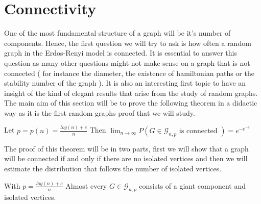 \section{Connectivity}

One of the most fundamental structure of a graph will be it's number of components. Hence, the first question we will try to ask is how often a random graph in the Erdos-Renyi model is connected. It is essential to answer this question as many other questions might not make sense on a graph that is not connected ( for instance the diameter, the existence of hamiltonian paths or the stability number of the graph ). 
\newline
It is also an interesting first topic to have an insight of the kind of elegant results that arise from the study of random graphs. The main aim of this section will be to prove the following theorem in a didactic way as it is the first random graphs proof that we will study.
\begin{theorem}
Let $p = p(n) = \frac{log(n) + c}{n}$
\newline
Then $\lim_{n \to \infty} P(G \in \mathcal{G}_{n, p}\text{ is connected }) = e^{-e^{-c}}$ 
\end{theorem}
The proof of this theorem will be in two parts, first we will show that a graph will be connected if and only if there are no isolated vertices and then we will estimate the distribution that follows the number of isolated vertices.
\begin{theorem}
	With $p = \frac{log(n) + c}{n}$
	 Almost every $G \in \mathcal{G}_{n, p}$ consists of a giant component and isolated vertices. 
\end{theorem}
